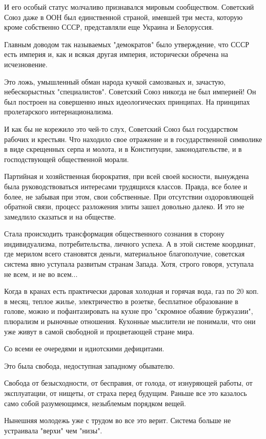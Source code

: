 И его особый статус молчаливо признавался мировым сообществом. Советский Союз
даже в ООН был единственной страной, имевшей три места, которую кроме
собственно СССР, представляли еще Украина и Белоруссия.

Главным доводом так называемых "демократов" было утверждение, что СССР есть
империя и, как и всякая другая империя, исторически обречена на исчезновение.

Это ложь, умышленный обман народа кучкой самозваных и, зачастую, небескорыстных
"специалистов". Советский Союз никогда не был империей! Он был построен на
совершенно иных идеологических принципах. На принципах пролетарского
интернационализма.

И как бы не корежило это чей-то слух, Советский Союз был государством рабочих и
крестьян.  Что находило свое отражение и в государственной символике в виде
скрещенных серпа и молота, и в Конституции, законодательстве, и в
господствующей общественной морали.

Партийная и хозяйственная бюрократия, при всей своей косности, вынуждена была
руководствоваться интересами трудящихся классов. Правда, все более и более, не
забывая при этом, свои собственные. При отсутствии оздоровляющей обратной
связи, процесс разложения элиты зашел довольно далеко. И это не замедлило
сказаться и на обществе.

Стала происходить трансформация общественного сознания в сторону
индивидуализма, потребительства, личного успеха. А в этой системе координат,
где мерилом всего становятся деньги, материальное благополучие, советская
система явно уступала развитым странам Запада. Хотя, строго говоря, уступала не
всем, и не во всем...

Когда в кранах есть практически даровая холодная и горячая вода, газ по 20 коп.
в месяц, теплое жилье, электричество в розетке, бесплатное образование в
голове, можно и пофантазировать на кухне про "скромное обаяние буржуазии",
плюрализм и рыночные отношения. Кухонные мыслители не понимали, что они уже
живут в самой свободной и процветающей стране мира.

Со всеми ее очередями и идиотскими дефицитами.

Это была свобода, недоступная западному обывателю.

Свобода от безысходности, от бесправия, от голода, от изнуряющей работы, от
эксплуатации, от нищеты, от страха перед будущим. Раньше все это казалось само
собой разумеющимся, незыблемым порядком вещей.

Нынешняя молодежь уже с трудом во все это верит. Система больше не устраивала
"верхи" чем "низы".

